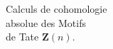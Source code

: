 
\begin{flushright}
Calculs de cohomologie\\
absolue des Motifs\\
de Tate $\mathbf Z(n)$.
\end{flushright}

